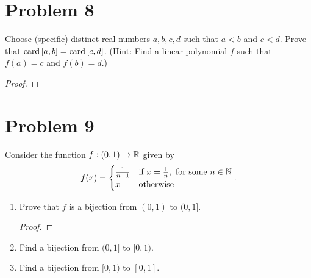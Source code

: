 \documentclass[11pt,a4paper]{article}
\begin{document}
\section*{Problem 8} Choose (specific) distinct real numbers \( a,b,c,d  \) such that \( a < b  \) and \( c < d  \). Prove that \( \operatorname{card}{[a,b]} = \operatorname{card}{[c,d]}  \). (Hint: Find a linear polynomial \( f  \) such that \( f(a) = c  \) and \( f(b) = d  \).)
\begin{proof}

\end{proof}

\section*{Problem 9} Consider the function \( f: (0,1) \to \mathbb{R}  \) given by 
\[  f(x) = 
\begin{cases}
    \frac{ 1 }{ n - 1  }  &\text{if} \ x = \frac{ 1 }{ n }, \  \text{for some} \ n \in \mathbb{N} \\ 
    x &\text{otherwise}
\end{cases}. 
\]
\begin{enumerate}
    \item Prove that \( f  \) is a bijection from \( (0,1)  \) to \( (0,1] \).
        \begin{proof}
        
        \end{proof}
    \item Find a bijection from \( (0,1]  \) to \( [0,1) \).
        \begin{solution}
            
        \end{solution}
    \item Find a bijection from \(  [0,1)  \) to \( [0,1] \).
        \begin{solution}
        
        \end{solution}

\end{enumerate}
\end{document}
